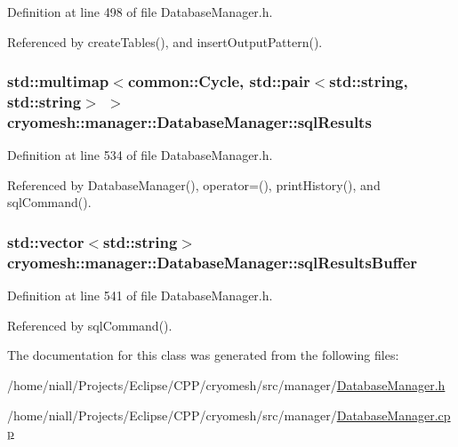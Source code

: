 \-Definition at line 498 of file \-Database\-Manager.\-h.



\-Referenced by create\-Tables(), and insert\-Output\-Pattern().

\hypertarget{classcryomesh_1_1manager_1_1DatabaseManager_a1f492cb29428437d917edf1e5b085825}{
\subsubsection[{sql\-Results}]{\setlength{\rightskip}{0pt plus 5cm}std\-::multimap$<${\bf common\-::\-Cycle}, std\-::pair$<$std\-::string, std\-::string$>$ $>$ {\bf cryomesh\-::manager\-::\-Database\-Manager\-::sql\-Results}}}\label{classcryomesh_1_1manager_1_1DatabaseManager_a1f492cb29428437d917edf1e5b085825}


\-Definition at line 534 of file \-Database\-Manager.\-h.



\-Referenced by \-Database\-Manager(), operator=(), print\-History(), and sql\-Command().

\hypertarget{classcryomesh_1_1manager_1_1DatabaseManager_aae9b0bfc988f6cab5dc3b0f931c7214c}{
\subsubsection[{sql\-Results\-Buffer}]{\setlength{\rightskip}{0pt plus 5cm}std\-::vector$<$std\-::string$>$ {\bf cryomesh\-::manager\-::\-Database\-Manager\-::sql\-Results\-Buffer}}}\label{classcryomesh_1_1manager_1_1DatabaseManager_aae9b0bfc988f6cab5dc3b0f931c7214c}


\-Definition at line 541 of file \-Database\-Manager.\-h.



\-Referenced by sql\-Command().



\-The documentation for this class was generated from the following files\-:\begin{DoxyCompactItemize}
\item 
/home/niall/\-Projects/\-Eclipse/\-C\-P\-P/cryomesh/src/manager/\hyperlink{DatabaseManager_8h}{\-Database\-Manager.\-h}\item 
/home/niall/\-Projects/\-Eclipse/\-C\-P\-P/cryomesh/src/manager/\hyperlink{DatabaseManager_8cpp}{\-Database\-Manager.\-cpp}\end{DoxyCompactItemize}
